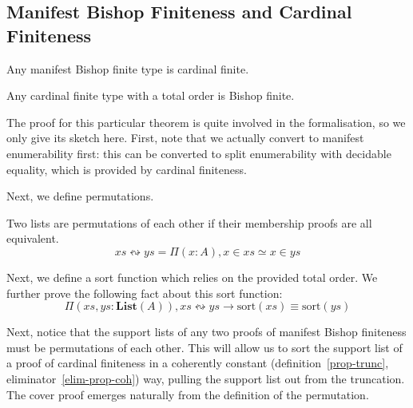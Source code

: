 \subsection{Manifest Bishop Finiteness and Cardinal Finiteness}
\begin{romlemma} \label{manifest-bishop-to-cardinal}
  Any manifest Bishop finite type is cardinal finite.
\end{romlemma}
\begin{romtheorem} \label{cardinal-to-manifest-bishop}
  Any cardinal finite type with a total order is Bishop finite.
\end{romtheorem}
The proof for this particular theorem is quite involved in the formalisation, so
we only give its sketch here.
First, note that we actually convert to manifest enumerability first: this can
be converted to split enumerability with decidable equality, which is provided
by cardinal finiteness.

Next, we define permutations.
\begin{romdefinition}
  Two lists are permutations of each other if their membership proofs are all
  equivalent\footnotemark \cite{danielssonBagEquivalenceProofRelevant2012}.
  \begin{equation}
    \mathit{xs} \leftrightsquigarrow \mathit{ys} = \Pi {(x : A)} , x \in \mathit{xs} \simeq x \in \mathit{ys}
  \end{equation}
\end{romdefinition}


Next, we define a sort function which relies on the provided total order.
We further prove the following fact about this sort function:
\begin{equation}
  \Pi(\mathit{xs}, \mathit{ys} : \mathbf{List}(A)) , \mathit{xs} \leftrightsquigarrow \mathit{ys} \rightarrow \text{sort}(\mathit{xs}) \equiv \text{sort}(\mathit{ys})
\end{equation}

Next, notice that the support lists of any two proofs of manifest Bishop
finiteness must be permutations of each other.
This will allow us to sort the support list of a proof of cardinal finiteness in
a coherently constant (definition~\ref{prop-trunc},
eliminator~\ref{elim-prop-coh}) way, pulling the support list out from the
truncation.
The cover proof emerges naturally from the definition of the permutation.
